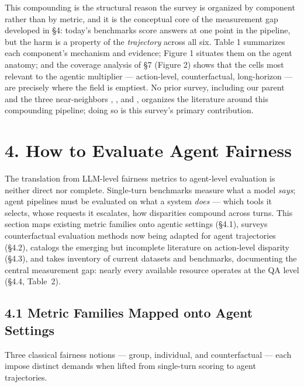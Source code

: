 \documentclass[sigconf,nonacm]{acmart}
\begin{document}
This compounding is the structural reason the survey is organized by component rather than by metric, and it is the conceptual core of the measurement gap developed in §4: today's benchmarks score answers at one point in the pipeline, but the harm is a property of the \emph{trajectory} across all six. Table 1 summarizes each component's mechanism and evidence; Figure 1 situates them on the agent anatomy; and the coverage analysis of §7 (Figure 2) shows that the cells most relevant to the agentic multiplier — action-level, counterfactual, long-horizon — are precisely where the field is emptiest. No prior survey, including our parent \cite{chu2024fairness} and the three near-neighbors \cite{mohammadi2025evaluation}, \cite{vatsal2026agentic}, and \cite{mayilvaghanan2026counterfactual}, organizes the literature around this compounding pipeline; doing so is this survey's primary contribution.



\section{4. How to Evaluate Agent Fairness}

The translation from LLM-level fairness metrics to agent-level evaluation is neither direct nor complete. Single-turn benchmarks measure what a model \emph{says}; agent pipelines must be evaluated on what a system \emph{does} — which tools it selects, whose requests it escalates, how disparities compound across turns. This section maps existing metric families onto agentic settings (§4.1), surveys counterfactual evaluation methods now being adapted for agent trajectories (§4.2), catalogs the emerging but incomplete literature on action-level disparity (§4.3), and takes inventory of current datasets and benchmarks, documenting the central measurement gap: nearly every available resource operates at the QA level (§4.4, Table~2).

\subsection{4.1 Metric Families Mapped onto Agent Settings}

Three classical fairness notions — group, individual, and counterfactual — each impose distinct demands when lifted from single-turn scoring to agent trajectories.
\end{document}
